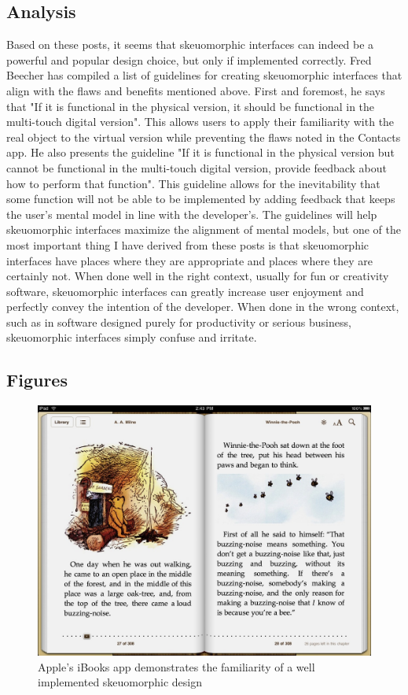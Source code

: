 \documentclass{article}
\begin{document}
\subsection{Analysis}
	Based on these posts, it seems that skeuomorphic interfaces can indeed be a powerful and popular design choice, but only if implemented correctly. Fred Beecher has compiled a list of guidelines for creating skeuomorphic interfaces that align with the flaws and benefits mentioned above. First and foremost, he says that "If it is functional in the physical version, it should be functional in the multi-touch digital version"\cite{guidelines}. This allows users to apply their familiarity with the real object to the virtual version while preventing the flaws noted in the Contacts app. He also presents the guideline "If it is functional in the physical version but cannot be functional in the multi-touch digital version, provide feedback about how to perform that function"\cite{guidelines}. This guideline allows for the inevitability that some function will not be able to be implemented by adding feedback that keeps the user's mental model in line with the developer's.
	The guidelines will help skeuomorphic interfaces maximize the alignment of mental models, but one of the most important thing I have derived from these posts is that skeuomorphic interfaces have places where they are appropriate and places where they are certainly not. When done well in the right context, usually for fun or creativity software, skeuomorphic interfaces can greatly increase user enjoyment and perfectly convey the intention of the developer. When done in the wrong context, such as in software designed purely for productivity or serious business, skeuomorphic interfaces simply confuse and irritate.
\subsection{Figures}

\begin{figure}
\centering
\includegraphics[width=5in]{iBooks.jpg} 

\caption{Apple's iBooks app demonstrates the familiarity of a well implemented skeuomorphic design}
\label{ibooks}
\end{figure}
\end{document}
